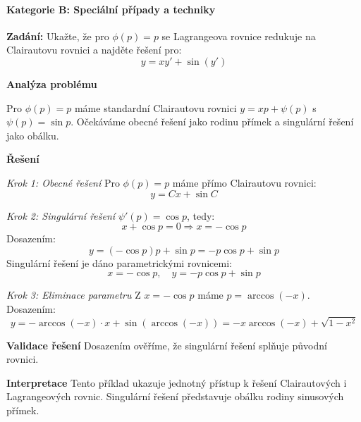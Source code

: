     \paragraph*{Kategorie B: Speciální případy a techniky}
    
    \begin{example}
    \label{ex:redukce-clairaut}
    
    \noindent\textbf{Zadání:} Ukažte, že pro $\phi(p) = p$ se Lagrangeova rovnice redukuje na Clairautovu rovnici a najděte řešení pro:
    \[
    y = xy' + \sin(y')
    \]
    
    \vspace{1.5\baselineskip}
    
    \noindent\textbf{Analýza problému}
    
    Pro $\phi(p) = p$ máme standardní Clairautovu rovnici $y = xp + \psi(p)$ s $\psi(p) = \sin p$. Očekáváme obecné řešení jako rodinu přímek a singulární řešení jako obálku.
    
    \vspace{1.5\baselineskip}
    
    \noindent\textbf{Řešení}
    
    \noindent\textit{Krok 1: Obecné řešení}
    Pro $\phi(p) = p$ máme přímo Clairautovu rovnici:
    \[
    y = Cx + \sin C
    \]
    
    \vspace{1\baselineskip}
    
    \noindent\textit{Krok 2: Singulární řešení}
    $\psi'(p) = \cos p$, tedy:
    \[
    x + \cos p = 0 \Rightarrow x = -\cos p
    \]
    Dosazením:
    \[
    y = (-\cos p)p + \sin p = -p\cos p + \sin p
    \]
    Singulární řešení je dáno parametrickými rovnicemi:
    \[
    x = -\cos p, \quad y = -p\cos p + \sin p
    \]
    
    \vspace{1\baselineskip}
    
    \noindent\textit{Krok 3: Eliminace parametru}
    Z $x = -\cos p$ máme $p = \arccos(-x)$. Dosazením:
    \[
    y = -\arccos(-x)\cdot x + \sin(\arccos(-x)) = -x\arccos(-x) + \sqrt{1 - x^2}
    \]
    
    \vspace{1.5\baselineskip}
    
    \noindent\textbf{Validace řešení}
    Dosazením ověříme, že singulární řešení splňuje původní rovnici.
    
    \vspace{1.5\baselineskip}
    
    \noindent\textbf{Interpretace}
    Tento příklad ukazuje jednotný přístup k řešení Clairautových i Lagrangeových rovnic. Singulární řešení představuje obálku rodiny sinusových přímek.
    
    \end{example}
    
